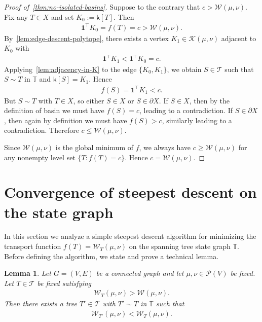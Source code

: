 \documentclass[10pt,a4paper]{amsart}
\newcommand{\prob}{{\mathscr{P}}}
\newcommand{\wass}{{\mathcal{W}}}
\newcommand{\setoftrees}{{\mathcal{T}}}
\newcommand{\stategraph}{{\mathbb{T}}}
\newcommand{\embedding}{{\mathsf{k}}}
\newcommand{\flowpoly}{{\mathcal{K}}}
\newtheorem{lemma}[theorem]{Lemma}
\begin{document}
\begin{proof}[Proof of~\cref{thm:no-isolated-basins}]
    Suppose to the contrary that $c>\wass(\mu,\nu)$. Fix any $T\in X$ and set $K_0:=\embedding[T]$. Then
        \begin{align*}
            \mathbf{1}^\top K_0 = f(T)=c>\wass(\mu,\nu).
        \end{align*}
    By~\cref{lem:edge-descent-polytope}, there exists a vertex $K_1\in\flowpoly(\mu,\nu)$ adjacent to $K_0$ with
        \begin{align*}
            \mathbf{1}^\top K_1 < \mathbf{1}^\top K_0 = c.
        \end{align*}
    Applying~\cref{lem:adjacency-in-K} to the edge $\{K_0,K_1\}$, we obtain $S\in\setoftrees$ such that $S\sim T$ in $\stategraph$ and $\embedding[S]=K_1$. Hence
        \begin{align*}
            f(S)=\mathbf{1}^\top K_1 < c.
        \end{align*}
    But $S\sim T$ with $T\in X$, so either $S\in X$ or $S\in\partial X$. If $S\in X$, then by the definition of basin we must have $f(S)=c$, leading to a contradiction. If $S\in\partial X$, then again by definition we must have $f(S)>c$, similarly leading to a contradiction. Therefore $c\le \wass(\mu,\nu)$.

    Since $\wass(\mu,\nu)$ is the global minimum of $f$, we always have $c\ge \wass(\mu,\nu)$ for any nonempty level set $\{T: f(T)=c\}$. Hence $c=\wass(\mu,\nu)$.
\end{proof}

\section{Convergence of steepest descent on the state graph}\label{sec:steepest-descent}

In this section we analyze a simple steepest descent algorithm for minimizing the transport function $f(T) = \wass_T(\mu,\nu)$ on the spanning tree state graph $\stategraph$. Before defining the algorithm, we state and prove a technical lemma.

\begin{lemma}\label{lem:descent-step}
    Let $G=(V,E)$ be a connected graph and let $\mu,\nu\in\prob(V)$ be fixed. Let $T\in\setoftrees$ be fixed satisfying
        \begin{align*}
            \wass_T(\mu,\nu) > \wass(\mu,\nu).
        \end{align*}
    Then there exists a tree $T'\in\setoftrees$ with $T'\sim T$ in $\stategraph$ such that
        \begin{align*}
            \wass_{T'}(\mu,\nu) < \wass_T(\mu,\nu).
        \end{align*}
\end{lemma}
\end{document}
